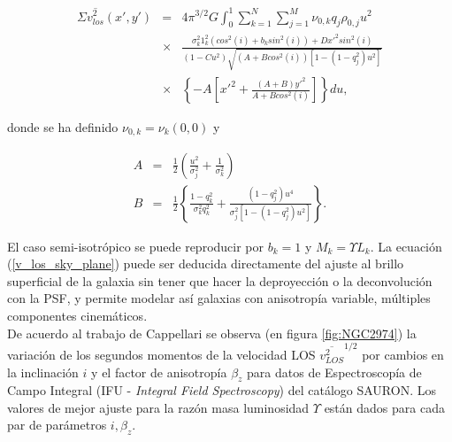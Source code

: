 \begin{eqnarray}
\label{v_los_sky_plane}
\Sigma \overline{v_{los}^2}(x', y') &=& 4\pi^{3/2} G \int_0^1 \sum_{k=1}^N \sum_{j=1}^M \nu_{0,k} q_j \rho_{0,j} u^2 \\
    &\times & \frac{ \sigma_k^2 1_k^2(cos^2(i) + b_k sin^2(i)) + Dx'^2 sin^2(i) }{ (1-Cu^2) \sqrt{ (A+B cos^2 (i) ) [ 1-(1-q_j^2)u^2 ] } } \\
  & \times & \left \{  -A\left[ x'^2 + \frac{(A+B)y'^2}{ A+Bcos^2(i) } \right]  \right \} du,
\end{eqnarray}

donde se ha definido $\nu_{0,k}=\nu_k(0,0)$ y

\begin{eqnarray}
A &=& \frac{1}{2} \left( \frac{u^2}{\sigma_j^2} + \frac{1}{\sigma_k^2}  \right) \\
B &=& \frac{1}{2} \left\{ \frac{1-q_k^2}{\sigma_k^2 q_k^2} + \frac{(1-q_j^2)u^4 }{\sigma_j^2 \left[ 1-(1-q_j^2)u^2 \right] }  \right\}.
\end{eqnarray}

El caso semi-isotrópico se puede reproducir por $b_k = 1$ y $M_k = \Upsilon L_k$. La ecuación (\ref{v_los_sky_plane}) puede ser deducida directamente del ajuste al brillo superficial de la galaxia sin tener que hacer la deproyección o la deconvolución con la PSF, y permite modelar así galaxias con anisotropía variable, múltiples componentes cinemáticos.\\


De acuerdo al trabajo de Cappellari \cite{2008MNRAS.390_71C} se observa (en figura \ref{fig:NGC2974}) la variación de los segundos momentos de la velocidad LOS $\overline{v_{LOS}^2}^{1/2}$  por cambios en la inclinación $i$ y el factor de anisotropía $\beta_z$ para datos de Espectroscopía de Campo Integral (IFU - \emph{Integral Field Spectroscopy}) del catálogo SAURON. Los valores de mejor ajuste para la razón masa luminosidad $\Upsilon$ están dados para cada par de parámetros $i, \beta_z$.\\


